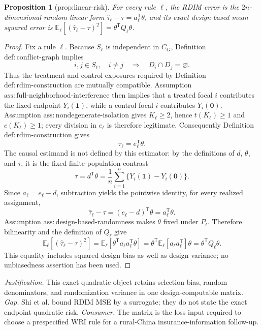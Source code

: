 \documentclass{article}
\newtheorem{proposition}{Proposition}
\begin{document}
\begin{proposition}[prop:linear-risk]\label{prop:linear-risk}
For every rule \(\ell\), the RDIM error is the \(2n\)-dimensional random linear form \(\widehat\tau_{\ell}-\tau=a_{\ell}^{\mathsf T}\theta\), and its exact design-based mean squared error is \(\mathbb E_{\ell}[(\widehat\tau_{\ell}-\tau)^2]=\theta^{\mathsf T}Q_{\ell}\theta\).
\end{proposition}
\begin{proof}
Fix a rule \(\ell\).  Because \(S_{\ell}\) is independent in \(C_G\), Definition \(\mathrm{def:conflict\mbox{-}graph}\) implies
\[
 i,j\in S_{\ell},\quad i\ne j
 \quad\Longrightarrow\quad
 D_i\cap D_j=\varnothing.
\]
Thus the treatment and control exposures required by Definition \(\mathrm{def:rdim\mbox{-}construction}\) are mutually compatible.  Assumption \(\mathrm{ass:full\mbox{-}neighborhood\mbox{-}interference}\) then implies that a treated focal \(i\) contributes the fixed endpoint \(Y_i(\mathbf 1)\), while a control focal \(i\) contributes \(Y_i(\mathbf 0)\).  Assumption \(\mathrm{ass:nondegenerate\mbox{-}isolation}\) gives \(K_{\ell}\ge2\), hence \(t(K_{\ell})\ge1\) and \(c(K_{\ell})\ge1\); every division in \(e_{\ell}\) is therefore legitimate.  Consequently Definition \(\mathrm{def:rdim\mbox{-}construction}\) gives
\[
 \widehat\tau_{\ell}=e_{\ell}^{\mathsf T}\theta.
\]
The causal estimand is not defined by this estimator: by the definitions of \(d\), \(\theta\), and \(\tau\), it is the fixed finite-population contrast
\[
 \tau=d^{\mathsf T}\theta
 =\frac1n\sum_{i=1}^n\{Y_i(\mathbf 1)-Y_i(\mathbf 0)\}.
\]
Since \(a_{\ell}=e_{\ell}-d\), subtraction yields the pointwise identity, for every realized assignment,
\[
 \widehat\tau_{\ell}-\tau
 =(e_{\ell}-d)^{\mathsf T}\theta
 =a_{\ell}^{\mathsf T}\theta.
\]
Assumption \(\mathrm{ass:design\mbox{-}based\mbox{-}randomness}\) makes \(\theta\) fixed under \(P_{\ell}\).  Therefore bilinearity and the definition of \(Q_{\ell}\) give
\[
 \mathbb E_{\ell}\!\left[(\widehat\tau_{\ell}-\tau)^2\right]
 =\mathbb E_{\ell}\!\left[\theta^{\mathsf T}a_{\ell}a_{\ell}^{\mathsf T}\theta\right]
 =\theta^{\mathsf T}\mathbb E_{\ell}[a_{\ell}a_{\ell}^{\mathsf T}]\theta
 =\theta^{\mathsf T}Q_{\ell}\theta.
\]
This equality includes squared design bias as well as design variance; no unbiasedness assertion has been used.
\end{proof}
\par\smallskip\noindent \textit{Justification.} This exact quadratic object retains selection bias, random denominators, and randomization variance in one design-computable matrix. \textit{Gap.} Shi et al. bound RDIM MSE by a surrogate; they do not state the exact endpoint quadratic risk. \textit{Consumer.} The matrix is the loss input required to choose a prespecified WRI rule for a rural-China insurance-information follow-up.
\end{document}

